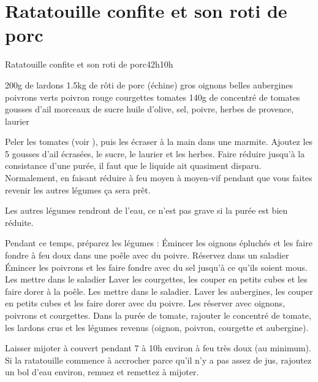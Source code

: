 {\section{Ratatouille confite et son roti de porc}
\begin{recette}{Ratatouille confite et son roti de porc}{4}{2h}{10h}
\begin{ingredients}
\ingredient 200g de lardons %
\ingredient 1.5kg de rôti de porc (échine)
 gros oignons
 belles aubergines
 poivrons verts
 poivron rouge
 courgettes
 tomates
\ingredient 140g de concentré de tomates
 gousses d'ail
 morceaux de sucre
\ingredient huile d'olive, sel, poivre, herbes de provence, laurier
\end{ingredients}

\begin{preparation}
\etape Peler les tomates (voir ), puis les écraser à la main dans une marmite. Ajoutez les 5 gousses 
d'ail écrasées, le sucre, le laurier et les herbes. 
\etape Faire réduire jusqu'à la consistance d'une purée, il faut que le liquide ait quasiment disparu. Normalement, en faisant 
réduire à feu moyen à moyen-vif pendant que vous faites revenir les autres légumes ça sera prêt. 
\begin{remarque}
Les autres légumes rendront de l'eau, ce n'est pas grave si la purée est bien réduite.
\end{remarque}
\etape Pendant ce temps, préparez les légumes : 
\etape Émincer les oignons épluchés et les faire fondre à feu doux dans une poêle avec du poivre. Réservez dans un saladier
\etape Émincer les poivrons et les faire fondre avec du sel jusqu'à ce qu'ils soient mous. Les mettre dans le saladier
\etape Laver les courgettes, les couper en petits cubes et les faire dorer à la poêle. Les mettre dans le saladier.
\etape Laver les aubergines, les couper en petits cubes et les faire dorer avec du poivre. Les réserver avec oignons, poivrons 
et courgettes.
\etape Dans la purée de tomate, rajouter le concentré de tomate, les lardons crus et les légumes revenus (oignon, poivron, 
courgette et aubergine).
\end{preparation}

\begin{cuisson}
Laisser mijoter à couvert pendant 7 à 10h environ à feu très doux (au minimum). Si la ratatouille commence à accrocher parce 
qu'il n'y a pas assez de jus, rajoutez un bol d'eau environ, remuez et remettez à mijoter.


\end{cuisson}
\end{recette}}

